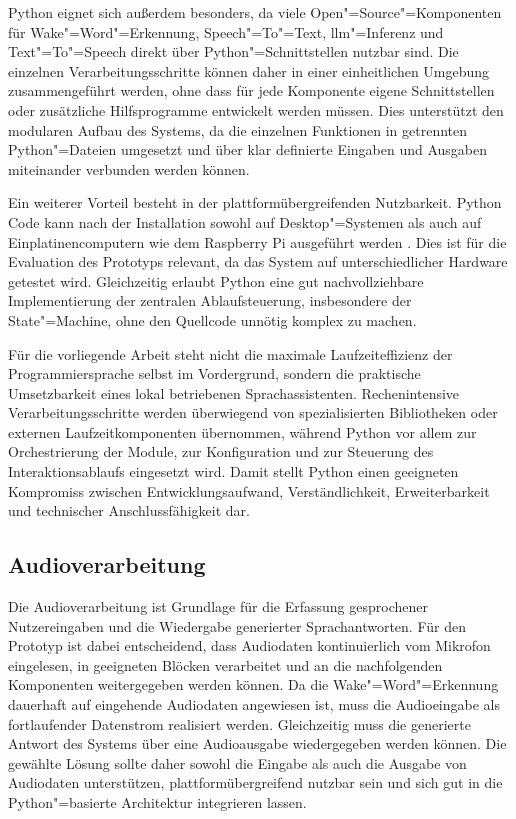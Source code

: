 Python eignet sich außerdem besonders, da viele Open"=Source"=Komponenten für Wake"=Word"=Erkennung, Speech"=To"=Text, \gls{llm}"=Inferenz und Text"=To"=Speech direkt über Python"=Schnittstellen nutzbar sind. Die einzelnen Verarbeitungsschritte können daher in einer einheitlichen Umgebung zusammengeführt werden, ohne dass für jede Komponente eigene Schnittstellen oder zusätzliche Hilfsprogramme entwickelt werden müssen. Dies unterstützt den modularen Aufbau des Systems, da die einzelnen Funktionen in getrennten Python"=Dateien umgesetzt und über klar definierte Eingaben und Ausgaben miteinander verbunden werden können.

Ein weiterer Vorteil besteht in der plattformübergreifenden Nutzbarkeit. Python Code kann nach der Installation sowohl auf Desktop"=Systemen als auch auf Einplatinencomputern wie dem Raspberry Pi ausgeführt werden \autocite{Python314-Documentation}. Dies ist für die Evaluation des Prototyps relevant, da das System auf unterschiedlicher Hardware getestet wird. Gleichzeitig erlaubt Python eine gut nachvollziehbare Implementierung der zentralen Ablaufsteuerung, insbesondere der State"=Machine, ohne den Quellcode unnötig komplex zu machen.

Für die vorliegende Arbeit steht nicht die maximale Laufzeiteffizienz der Programmiersprache selbst im Vordergrund, sondern die praktische Umsetzbarkeit eines lokal betriebenen Sprachassistenten. Rechenintensive Verarbeitungsschritte werden überwiegend von spezialisierten Bibliotheken oder externen Laufzeitkomponenten übernommen, während Python vor allem zur Orchestrierung der Module, zur Konfiguration und zur Steuerung des Interaktionsablaufs eingesetzt wird. Damit stellt Python einen geeigneten Kompromiss zwischen Entwicklungsaufwand, Verständlichkeit, Erweiterbarkeit und technischer Anschlussfähigkeit dar.


\subsection{Audioverarbeitung}
\label{subsec:Audioverarbeitung}
Die Audioverarbeitung ist Grundlage für die Erfassung gesprochener Nutzereingaben und die Wiedergabe generierter Sprachantworten. Für den Prototyp ist dabei entscheidend, dass Audiodaten kontinuierlich vom Mikrofon eingelesen, in geeigneten Blöcken verarbeitet und an die nachfolgenden Komponenten weitergegeben werden können. Da die Wake"=Word"=Erkennung dauerhaft auf eingehende Audiodaten angewiesen ist, muss die Audioeingabe als fortlaufender Datenstrom realisiert werden. Gleichzeitig muss die generierte Antwort des Systems über eine Audioausgabe wiedergegeben werden können. Die gewählte Lösung sollte daher sowohl die Eingabe als auch die Ausgabe von Audiodaten unterstützen, plattformübergreifend nutzbar sein und sich gut in die Python"=basierte Architektur integrieren lassen.

